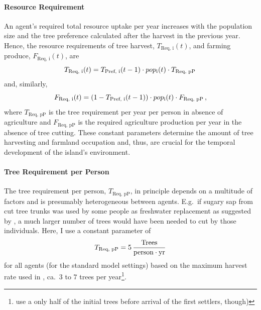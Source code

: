 \paragraph{Resource Requirement}
An agent's required total resource uptake per year increases with the population size and the tree preference calculated after the harvest in the previous year.
Hence, the resource requirements of tree harvest, $T_\text{Req, i}(t)$, and farming produce, $F_\text{Req, i}(t)$, are 
\begin{equation}
T_\text{Req, i}(t) = T_\text{Pref, i}(t-1) \cdot pop_{\rm i}(t) \cdot T_\text{Req, pP} \, 
\end{equation}
and, similarly, 
\begin{equation}
F_\text{Req, i}(t) = (1-T_\text{Pref, i}(t-1)) \cdot pop_{\rm i}(t) \cdot F_\text{Req, pP}\, , 
\end{equation}
where $T_\text{Req, pP}$ is the tree requirement per year per person in absence of agriculture and $F_\text{Req, pP}$ is the required agriculture production per year in the absence of tree cutting.
These constant parameters determine the amount of tree harvesting and farmland occupation and, thus, are crucial for the temporal development of the island's environment. 

\paragraph{Tree Requirement per Person}
The tree requirement per person, $T_\text{Req, pP}$, in principle depends on a multitude of factors and is presumably heterogeneous between agents.
E.g.\ if sugary sap from cut tree trunks was used by some people as freshwater replacement as suggested by \citet{Mieth2015}, a much larger number of trees would have been needed to cut by those individuals.
Here, I use a constant parameter of 
\begin{equation}
T_\text{Req, pP} = 5\, \frac{\text{Trees}}{\rm person\cdot yr}
\end{equation}
for all agents (for the standard model settings) based on the maximum harvest rate used in \citet{Brandt2015}, ca.\ $3$ to $7$ trees per year\footnote{\citet{Brandt2015} use a only half of the initial trees before arrival of the first settlers, though)}. 

